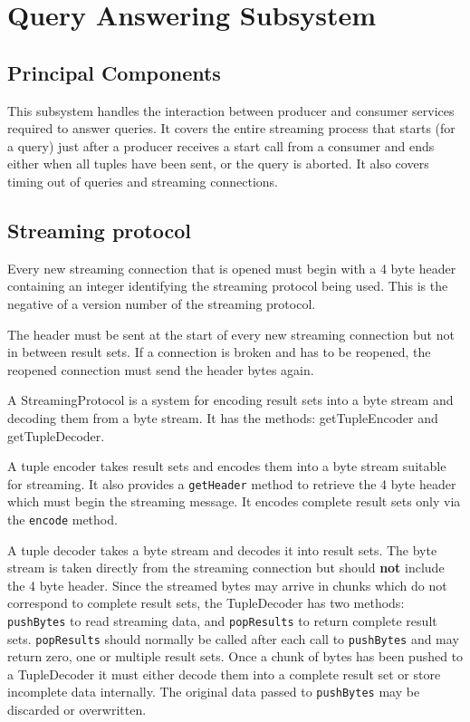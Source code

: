 \section{Query Answering Subsystem}
\label{sec:queryAnsweringSubsystem}

\subsection{Principal Components}

This subsystem handles the interaction between producer and consumer
services required to answer queries. It covers the entire streaming
process that starts (for a query) just after a producer receives a
start call from a consumer and ends either when all tuples have been
sent, or the query is aborted. It also covers timing out of queries
and streaming connections. 
\subsection{Streaming protocol}

Every new streaming connection that is opened must begin with a 4 byte header containing an
integer identifying the streaming protocol being used. This is the negative of a
version number of the streaming protocol.

The header must be sent at the start of every new streaming connection but not in between
result sets. If a connection is broken and has to be reopened, the reopened connection must
send the header bytes again.

A StreamingProtocol is a system for encoding result sets into a byte stream and decoding
them from a byte stream. It has the methods: 
getTupleEncoder and getTupleDecoder.

A tuple encoder takes result sets and encodes them into a byte stream suitable for streaming.
It also provides a \texttt{getHeader} method to retrieve the 4 byte header which must
begin the streaming message. It encodes complete result sets only via the \texttt{encode} method.




A tuple decoder takes a byte stream and decodes it into result sets. The byte stream is taken
directly from the streaming connection but should \textbf{not} include the 4 byte header.
Since the streamed bytes may arrive in chunks which do not correspond to complete result sets,
the TupleDecoder has two methods: \texttt{pushBytes} to read streaming data, and \texttt{popResults}
to return complete result sets. \texttt{popResults} should normally be called after each call
to \texttt{pushBytes} and may return zero, one or multiple result sets.
Once a chunk of bytes has been pushed to a TupleDecoder it must either decode them into a 
complete result set or store incomplete data internally. The original data passed to \texttt{pushBytes}
may be discarded or overwritten.




